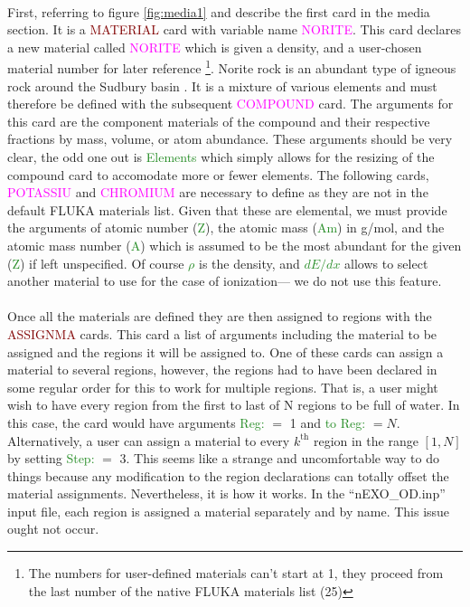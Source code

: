 \paragraph{}
First, referring to figure \ref{fig:media1} and describe the first card in the media section. It is a \textcolor{Maroon}{MATERIAL} card with variable name \textcolor{magenta}{NORITE}. This card declares a new material called \textcolor{magenta}{NORITE} which is given a density, and a user-chosen material number for later reference \footnote{The numbers for user-defined materials can't start at 1, they proceed from the last number of the native FLUKA materials list (25)}. Norite rock is an abundant type of igneous rock around the Sudbury basin \cite{sudbury_geology}. It is a mixture of various elements and must therefore be defined with the subsequent \textcolor{magenta}{COMPOUND} card. The arguments for this card are the component materials of the compound and their respective fractions by mass, volume, or atom abundance. These arguments should be very clear, the odd one out is \textcolor{ForestGreen}{Elements} which simply allows for the resizing of the compound card to accomodate more or fewer elements. The following cards, \textcolor{magenta}{POTASSIU} and \textcolor{magenta}{CHROMIUM} are necessary to define as they are not in the default FLUKA materials list. Given that these are elemental, we must provide the arguments of atomic number (\textcolor{ForestGreen}{Z}), the atomic mass (\textcolor{ForestGreen}{Am}) in g/mol, and the atomic mass number (\textcolor{ForestGreen}{A}) which is assumed to be the most abundant for the given (\textcolor{ForestGreen}{Z}) if left unspecified. Of course \textcolor{ForestGreen}{$\rho$} is the density, and \textcolor{ForestGreen}{$dE/dx$} allows to select another material to use for the case of ionization— we do not use this feature.

\paragraph{}
Once all the materials are defined they are then assigned to regions with the \textcolor{Maroon}{ASSIGNMA} cards. This card a list of arguments including the material to be assigned and the regions it will be assigned to. One of these cards can assign a material to several regions, however, the regions had to have been declared in some regular order for this to work for multiple regions. That is, a user might wish to have every region from the first to last of N regions to be full of water. In this case, the card would have arguments \textcolor{ForestGreen}{Reg:} $=$ 1 and \textcolor{ForestGreen}{to Reg:} $= N$. Alternatively, a user can assign a material to every $k^{\text{th}}$ region in the range $[1,N]$ by setting \textcolor{ForestGreen}{Step:} $=$ 3. This seems like a strange and uncomfortable way to do things because any modification to the region declarations can totally offset the material assignments. Nevertheless, it is how it works. In the ``nEXO\_OD.inp'' input file, each region is assigned a material separately and by name. This issue ought not occur.

